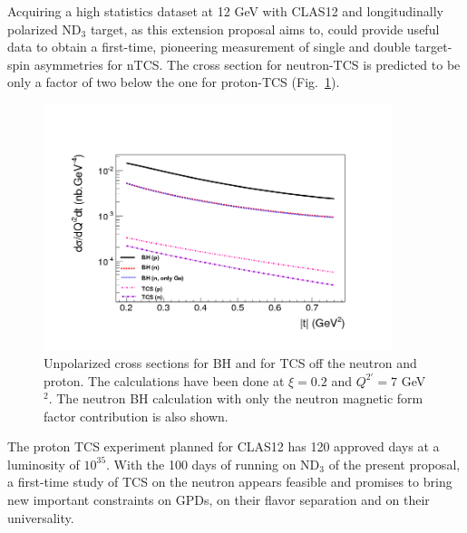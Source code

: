 \documentclass[a4paper,12pt]{report}
\begin{document}
Acquiring a high statistics dataset at 12 GeV with CLAS12 and longitudinally polarized ND$_3$ target, as this extension proposal aims to, could provide useful data to obtain a first-time, pioneering measurement of single and double target-spin asymmetries for nTCS. The cross section for neutron-TCS is predicted to be only a factor of two below the one for proton-TCS (Fig.~\ref{tcs_cs}). 
\begin{figure}[htbp] 
   \centering
   \includegraphics[width=4in]{comparcross_protonneutron_logy_0.png} 
   \caption{Unpolarized cross sections for BH and for TCS off the neutron and proton. The calculations have been done at $\xi=0.2$ and $Q^{2'}=7$ GeV$^2$. The neutron BH calculation with only the neutron magnetic form factor contribution is also shown.}
   \label{tcs_cs}
\end{figure}
The proton TCS experiment planned for CLAS12 has 120 approved days at a luminosity of $10^{35}$. With the 100 days of running on ND$_3$ of the present proposal, a first-time study of TCS on the neutron appears feasible and promises to bring new important constraints on GPDs, on their flavor separation and on their universality. 
\end{document}
